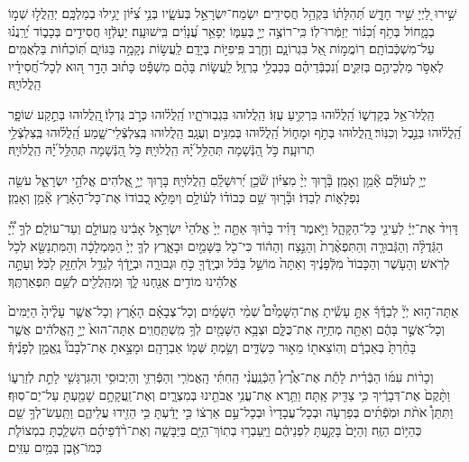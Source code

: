 \documentclass[twoside, openany, parskip=half, 11pt]{book}
\begin{document}
 
שִׁ֣ירוּ לַ֭יְיָ שִׁ֣יר חָדָ֑שׁ תְּ֝הִלָּת֗וֹ בִּקְהַ֥ל חֲסִידִֽים׃
יִשְׂמַח־יִשְׂרָאֵ֣ל בְּעֹשָׂ֑יו בְּנֵ֥י צִ֝יּ֗וֹן יָגִ֥ילוּ בְמַלְכָּֽם׃
יְהַֽלֲל֣וּ שְׁמ֣וֹ בְמָ֑חוֹל בְּתֹ֥ף וְ֝כִנּ֗וֹר יְזַמְּֿרוּ־לֽוֹ׃
כִּֽי־רוֹצֶ֣ה יְיָ֣ בְּעַמּ֑וֹ יְפָאֵ֥ר עֲ֝נָוִ֗ים בִּֽישׁוּעָֽה׃
יַעְלְֿז֣וּ חֲסִידִ֣ים בְּכָב֑וֹד יְ֝רַֽנֲנ֗וּ עַל־מִשְׁכְּֿבוֹתָֽם׃
 רֽוֹמֲמ֣וֹת אֵ֭ל בִּגְרוֹנָ֑ם וְחֶ֖רֶב פִּֽיפִיּ֣וֹת בְּיָדָֽם׃
לַֽעֲשׂ֣וֹת נְקָמָ֣ה בַּגּוֹיִ֑ם תּֽ֝וֹכֵח֗וֹת בַּלְאֻמִּֽים׃
לֶאְסֹּ֣ר מַלְכֵיהֶ֣ם בְּזִקִּ֑ים וְ֝נִכְבְּֿדֵיהֶ֗ם בְּכַבְלֵ֥י בַרְזֶֽל׃
לַֽעֲשׂ֤וֹת בָּהֶ֨ם מִשְׁפָּ֬ט כָּת֗וּב הָדָ֣ר ה֭וּא לְכָל־חֲ֝סִידָ֗יו הַֽלֲלוּיָֽהּ׃

 
הַֽלֲלוּ־אֵ֥ל בְּקָדְשׁ֑וֹ הַֽ֝לֲל֗וּהוּ בִּרְקִ֥יעַ עֻזּֽוֹ׃
הַֽלֲלוּהוּ בִּגְבֽוּרֹתָ֑יו הַֽ֝לֲל֗וּהוּ כְּרֹ֣ב גֻּדְלֽוֹ׃
֖הַֽלֲלוּהוּ בְּתֵ֣קַע שׁוֹפָ֑ר הַֽ֝לֲל֗וּהוּ בְּנֵ֣בֶל וְכִנּֽוֹר׃
֖הַֽלֲלוּהוּ בְּתֹ֣ף וּמָח֑וֹל הַֽ֝לֲל֗וּהוּ בְּמִנִּ֥ים וְעֻגָֽב׃
הַֽלֲלוּהוּ בְּֽצִלְצְֿלֵי־שָׁ֑מַע הַֽ֝לֲל֗וּהוּ בְּֽצִלְצְֿלֵ֥י תְרוּעָֽה׃
 כֹּ֣ל הַ֭נְּֿשָׁמָה תְּהַלֵּ֥ל ֝יָ֗הּ הַֽלֲלוּיָֽהּ׃
 כֹּ֣ל הַ֭נְּֿשָׁמָה תְּהַלֵּ֥ל ֝יָ֗הּ הַֽלֲלוּיָֽהּ׃
 

יְיָ֥ לְעוֹלָ֗ם אָ֘מֵ֥ן וְאָמֵֽן׃
בָּ֘ר֤וּךְ יְיָ֨ מִצִּיּ֗וֹן שֹׁ֘כֵ֥ן יְ֝רוּשָׁלַֽ֗םִ הַֽלֲלוּיָֽהּ׃
בָּר֤וּךְ יְיָ֣ אֱ֭לֹהִים אֱלֹהֵ֣י יִשְׂרָאֵ֑ל עֹשֵׂ֖ה נִפְלָא֑וֹת לְבַדּֽוֹ׃
וּבָ֘ר֤וּךְ שֵׁ֥ם כְּבוֹד֗וֹ לְע֫וֹלָ֥ם וְיִמָּלֵ֣א כְ֭בוֹדוֹ אֶת־כָּל־הָאָ֗רֶץ אָ֘מֵ֥ן וְאָמֵֽן׃


 
דָּוִיד֨ אֶת־יְיָ֔ לְעֵינֵ֖י כָּל־הַקָּהָ֑ל וַיֹּ֣אמֶר דָּוִ֗יד בָּר֨וּךְ אַתָּ֤ה יְיָ֙ אֱלֹהֵי֙ יִשְׂרָאֵ֣ל אָבִ֔ינוּ מֵֽעוֹלָ֖ם וְעַד־עוֹלָֽם׃ לְךָ֣ יְ֠יָ֠ הַגְּֿדֻלָּ֨ה וְהַגְּֿבוּרָ֤ה וְהַתִּפְאֶ֨רֶת֙ וְהַנֵּ֣צַח וְהַה֔וֹד כִּי־כֹ֖ל בַּשָּׁמַ֣יִם וּבָאָ֑רֶץ לְךָ֤ יְיָ֙ הַמַּמְלָכָ֔ה וְהַמִּתְנַשֵּׂ֖א לְכֹ֥ל לְרֹֽאשׁ׃ וְהָעֹ֤שֶׁר וְהַכָּבוֹד֙ מִלְּֿפָנֶ֔יךָ וְאַתָּה֙ מוֹשֵׁ֣ל בַּכֹּ֔ל וּבְיָֽדְֿךָ֖ כֹּ֣חַ וּגְבוּרָ֑ה וּבְיָ֣דְֿךָ֔ לְגַדֵּ֥ל וּלְחַזֵּ֖ק לַכֹּֽל׃ וְעַתָּ֣ה אֱלֹהֵ֔ינוּ מוֹדִ֥ים אֲנַ֖חְנוּ לָ֑ךְ וּֽמְהַֽלֲלִ֖ים לְשֵׁ֥ם תִּפְאַרְתֶּֽךָ׃

אַתָּה־ה֣וּא 
יְיָ֘ לְבַדֶּ֒ךָ֒ אַתָּ֣ עָשִֽׂ֡יתָ אֶֽת־הַשָּׁמַ֩יִם֩ שְׁמֵ֨י הַשָּׁמַ֜יִם וְכָל־צְבָאָ֗ם הָאָ֜רֶץ וְכָל־אֲשֶׁ֤ר עָלֶ֨יהָ֙ הַיַּמִּים֙ וְכָל־אֲשֶׁ֣ר בָּהֶ֔ם וְאַתָּ֖ה מְחַיֶּ֣ה אֶת־כֻּלָּ֑ם וּצְבָ֥א הַשָּׁמַ֖יִם לְךָ֥ מִֽשְׁתַּֽחֲוִֽים׃ אַתָּה־הוּא֙ יְיָ֣ הָֽאֱלֹהִ֔ים אֲשֶׁ֤ר בָּחַ֨רְתָּ֙ בְּאַבְרָ֔ם וְהֽוֹצֵאת֖וֹ מֵא֣וּר כַּשְׂדִּ֑ים וְשַׂ֥מְתָּ שְּׁמ֖וֹ אַבְרָהָֽם׃ וּמָצָ֣אתָ אֶת־לְבָבוֹ֘ נֶֽאֱמָ֣ן לְפָנֶ֒יךָ֒׃

וְכָר֨וֹת עִמּ֜וֹ הַבְּֿרִ֗ית לָתֵ֡ת אֶת־אֶ֩רֶץ֩ הַכְּֿנַֽעֲנִ֨י הַֽחִתִּ֜י הָֽאֱמֹרִ֧י וְהַפְּֿרִזִּ֛י וְהַיְבוּסִ֥י וְהַגִּרְגָּשִׁ֖י לָתֵ֣ת לְזַרְע֑וֹ וַתָּ֨קֶם֙ אֶת־דְּבָרֶ֔יךָ כִּ֥י צַדִּ֖יק אָֽתָּה׃ וַתֵּ֥רֶא אֶת־עֳנִ֥י אֲבֹתֵ֖ינוּ בְּמִצְרָ֑יִם וְאֶת־זַֽעֲקָתָ֥ם שָׁמַ֖עְתָּ עַל־יַם־סֽוּף׃ וַתִּתֵּן֩ אֹתֹ֨ת וּמֹֽפְֿתִ֜ים בְּפַרְעֹ֤ה וּבְכָל־עֲבָדָיו֙ וּבְכָל־עַ֣ם אַרְצ֔וֹ כִּ֣י יָדַ֔עְתָּ כִּ֥י הֵזִ֖ידוּ עֲלֵיהֶ֑ם וַתַּֽעַשׂ־לְךָ֥ שֵׁ֖ם כְּהַיּ֥וֹם הַזֶּֽה׃ וְהַיָּם֙ בָּקַ֣עְתָּ לִפְנֵיהֶ֔ם וַיַּֽעַבְר֥וּ בְתֽוֹךְ־הַיָּ֖ם בַּיַּבָּשָׁ֑ה וְאֶת־רֹ֨דְֿפֵיהֶ֜ם הִשְׁלַ֧כְתָּ בִמְצוֹלֹ֛ת כְּמוֹ־אֶ֖בֶן בְּמַ֥יִם עַזִּֽים׃
\end{document}
